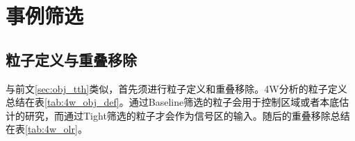 \section{事例筛选}\label{sec:evtsel}


\subsection{粒子定义与重叠移除}\label{subsec:4w_obj_def}
与前文\ref{sec:obj_tth}类似，首先须进行粒子定义和重叠移除。4W分析的粒子定义总结在表\ref{tab:4w_obj_def}。通过Baseline筛选的粒子会用于控制区域或者本底估计的研究，而通过Tight筛选的粒子才会作为信号区的输入。随后的重叠移除总结在表\ref{tab:4w_olr}。



\clearpage
